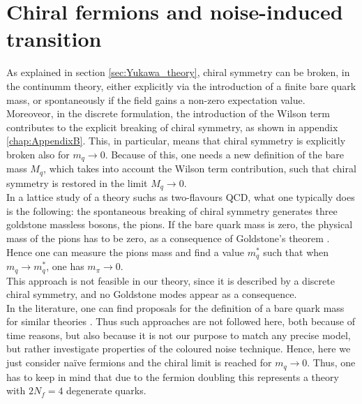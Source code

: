 \section{Chiral fermions and noise-induced transition}
\label{sec:chiral_PT}
As explained in section \ref{sec:Yukawa_theory}, chiral symmetry can be broken, in the continumm theory, either explicitly via the introduction of a finite bare quark mass, or spontaneously if the field gains a non-zero expectation value.\\
Moreoveor, in the discrete formulation, the introduction of the Wilson term contributes to the explicit breaking of chiral symmetry, as shown in appendix \ref{chap:AppendixB}. This, in particular, means that chiral symmetry is explicitly broken also for $m_q \to 0$. Because of this, one needs a new definition of the bare mass $M_q$, which takes into account the Wilson term contribution, such that chiral symmetry is restored in the limit $M_q \to 0$. \\
In a lattice study of a theory suchs as  two-flavours QCD, what one typically does \cite{rothe_LGT,gattringer_LQCD} is the following: the spontaneous breaking of chiral symmetry generates three goldstone massless bosons, the pions. If the bare quark mass is zero, the physical mass of the pions has to be zero, as a consequence of Goldstone's theorem \cite{goldstone}. Hence one can measure the pions mass and find a value $m_q^*$ such that when $m_q \to m_q^*$, one has $m_\pi \to 0$. \\
This approach is not feasible in our theory, since it is described by a discrete chiral symmetry, and no Goldstone modes appear as a consequence. \\
In the literature, one can find proposals for the definition of a bare quark mass for similar theories \cite{Iwasaki:1994gq,MAIANI1986265}. Thus such approaches are not followed here, both because of time reasons, but also because it is not our purpose to match any precise model, but rather investigate properties of the coloured noise technique. Hence, here we just consider na\"ive fermions and the chiral limit is reached for $m_q \to 0$. Thus, one has to keep in mind that due to the fermion doubling this represents a theory with $2N_f = 4$ degenerate quarks.
